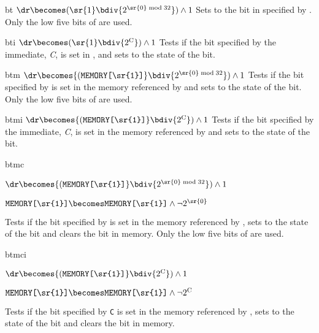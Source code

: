 \begin{instruction}{bt}
     {
       $\dr \becomes ({\sr{1}} \bdiv {2^{\textrm{\sr{0}} \bmod 32}}) \wedge 1$
     }
     {
       Sets \dr to the bit in  specified by .  Only the low
       five bits of  are used.
     }
\end{instruction}


\begin{instruction}{bti}
     {\btcropc}
     {
       $\dr \becomes ({\sr{1}} \bdiv {2^{\textrm{C}}}) \wedge 1$
     }
     {
       Tests if the bit specified by the immediate, \emph{C}, is set
       in , and sets \dr to the state of the bit.
     }
\end{instruction}


\begin{instruction}{btm}
     {\btmopc}
     {
       $\dr \becomes {(\texttt{MEMORY[\sr{1}]}} \bdiv {2^{\sr{0} \bmod 32}}) \wedge  1$
     }
     {
       Tests if the bit specified by  is set in the memory
       referenced by  and sets \dr to the state of the bit.  Only
       the low five bits of  are used.
     }
\end{instruction}


\begin{instruction}{btmi}
    {
      $\dr \becomes {(\texttt{MEMORY[\sr{1}]}} \bdiv {2^{\textrm{C}}}) \wedge  1$
    }
    {
      Tests if the bit specified by the immediate, \emph{C}, is set in
      the memory referenced by  and sets \dr to the state of the
      bit.
    }
\end{instruction}


\begin{instruction}{btmc}
    {$\dr \becomes {(\texttt{MEMORY[\sr{1}]}} \bdiv {2^{\sr{0} \bmod 32}}) \wedge  1$

     $\texttt{MEMORY[\sr{1}]} \becomes \texttt{MEMORY[\sr{1}]} \wedge \neg {2^{\textrm{\sr{0}}}}$}
    {
      Tests if the bit specified by  is set in the memory
      referenced by , sets \dr to the state of the bit and
      clears the bit in memory.  Only the low five bits of 
      are used.
    }
\end{instruction}


\begin{instruction}{btmci}
    {$\dr \becomes {(\texttt{MEMORY[\sr{1}]}} \bdiv {2^{\textrm{C}}}) \wedge  1$

     $\texttt{MEMORY[\sr{1}]} \becomes \texttt{MEMORY[\sr{1}]} \wedge \neg {2^{\textrm{C}}}$}
    {Tests if the bit specified by \texttt{C} is set in the memory
      referenced by , sets \dr to the state of the bit and
      clears the bit in memory.}
\end{instruction}


